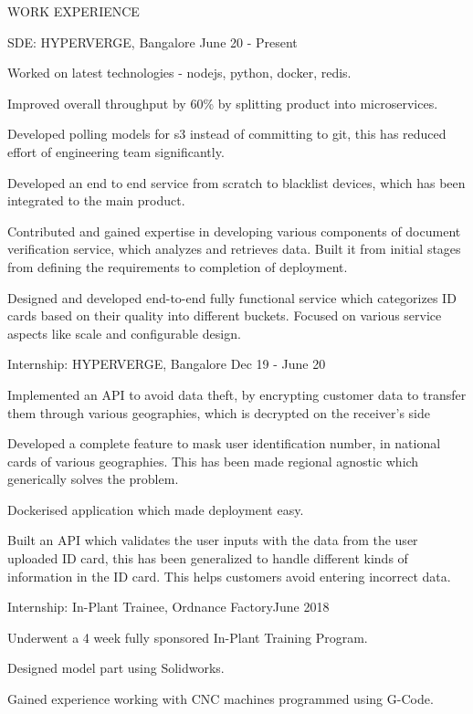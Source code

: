 \documentclass{resume} %
\begin{document}
\begin{rSection}{ WORK EXPERIENCE }

\begin{rSubsection}{ SDE: HYPERVERGE, Bangalore} {June 20 - Present}{}
    
    \item Worked on latest technologies - nodejs, python, docker, redis.
    \item Improved overall throughput by 60\% by splitting product into microservices.
    \item Developed polling models for s3 instead of committing to git, this has reduced effort of engineering team significantly.
    \item Developed an end to end service from scratch to blacklist devices, which has been integrated to the main product.
    \item Contributed and gained expertise in developing various components of document verification service, which analyzes and retrieves data. Built it from initial stages from defining the requirements to completion of deployment.
    \item Designed and developed end-to-end fully functional service which categorizes ID cards based on their quality into different buckets. Focused on various service aspects like scale and configurable design.
    
\end{rSubsection}

\begin{rSubsection}{ Internship: HYPERVERGE, Bangalore} {Dec 19 - June 20}{}
    
    \item Implemented an API to avoid data theft, by encrypting customer data to transfer them through various geographies, which is decrypted on the receiver's side
    \item Developed a complete feature to mask user identification number, in national cards of various geographies. This has been made regional agnostic which generically solves the problem.
    \item Dockerised application which made deployment easy.
    \item Built an API which validates the user inputs with the data from the user uploaded ID card, this has been generalized to handle different kinds of information in the ID card. This helps customers avoid entering incorrect data.
    
\end{rSubsection}

\begin{rSubsection}{ Internship: In-Plant Trainee, Ordnance Factory}{June 2018}{}

    \item Underwent a 4 week fully sponsored In-Plant Training Program.
    \item Designed model part using Solidworks.
    \item Gained experience working with CNC machines programmed using G-Code.

\end{rSubsection}

\end{rSection}
\end{document}
